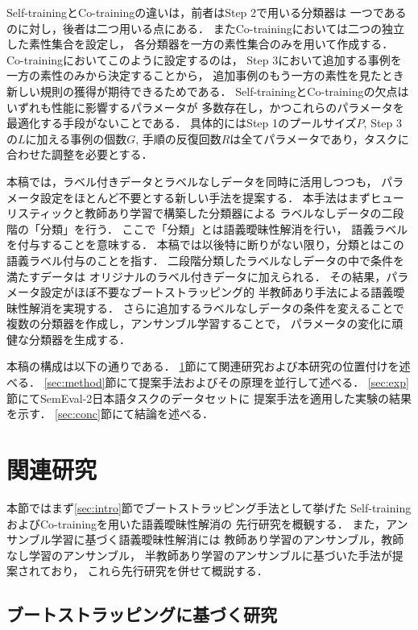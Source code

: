 \documentclass[japanese]{jnlp_1.4}
\begin{document}
Self-trainingとCo-trainingの違いは，前者はStep 2で用いる分類器は
一つであるのに対し，後者は二つ用いる点にある．
またCo-trainingにおいては二つの独立した素性集合を設定し，
各分類器を一方の素性集合のみを用いて作成する．
Co-trainingにおいてこのように設定するのは，
Step 3において追加する事例を一方の素性のみから決定することから，
追加事例のもう一方の素性を見たとき新しい規則の獲得が期待できるためである．
Self-trainingとCo-trainingの欠点はいずれも性能に影響するパラメータが
多数存在し，かつこれらのパラメータを最適化する手段がないことである．
具体的にはStep 1のプールサイズ$P$, Step 3の$L$に加える事例の個数$G$, 
手順の反復回数$R$は全てパラメータであり，タスクに合わせた調整を必要とする．

本稿では，ラベル付きデータとラベルなしデータを同時に活用しつつも，
パラメータ設定をほとんど不要とする新しい手法を提案する．
本手法はまずヒューリスティックと教師あり学習で構築した分類器による
ラベルなしデータの二段階の「分類」を行う．
ここで「分類」とは語義曖昧性解消を行い，
語義ラベルを付与することを意味する．
本稿では以後特に断りがない限り，分類とはこの語義ラベル付与のことを指す．
二段階分類したラベルなしデータの中で条件を満たすデータは
オリジナルのラベル付きデータに加えられる．
その結果，パラメータ設定がほぼ不要なブートストラッピング的
半教師あり手法による語義曖昧性解消を実現する．
さらに追加するラベルなしデータの条件を変えることで
複数の分類器を作成し，アンサンブル学習することで，
パラメータの変化に頑健な分類器を生成する．

本稿の構成は以下の通りである．
\ref{sec:work}節にて関連研究および本研究の位置付けを述べる．
\ref{sec:method}節にて提案手法およびその原理を並行して述べる．
\ref{sec:exp}節にてSemEval-2日本語タスク\cite{Okumura10}のデータセットに
提案手法を適用した実験の結果を示す．
\ref{sec:conc}節にて結論を述べる．


\section{関連研究}
\label{sec:work}

本節ではまず\ref{sec:intro}節でブートストラッピング手法として挙げた
Self-trainingおよびCo-trainingを用いた語義曖昧性解消の
先行研究を概観する．
また，アンサンブル学習に基づく語義曖昧性解消には
教師あり学習のアンサンブル，教師なし学習のアンサンブル，
半教師あり学習のアンサンブルに基づいた手法が提案されており，
これら先行研究を併せて概説する．


\subsection{ブートストラッピングに基づく研究}
\label{sec:work1}
\end{document}
